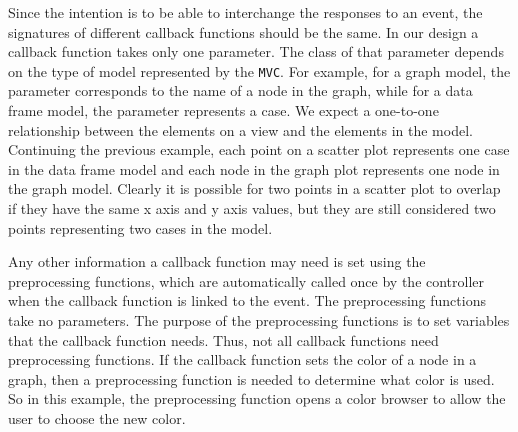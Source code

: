 \documentclass[11pt]{article}
\newcommand{\Robject}[1]{{\texttt{#1}}}
\begin{document}
Since the intention is to be able to interchange the responses to an event,
the signatures of different callback functions should be the same.
In our design a callback function takes only one parameter. 
The class of that parameter depends on the type of model represented by the
\Robject{MVC}.  For example, for a graph model, the parameter corresponds to
the name of a node in the graph, while for a data frame model, the parameter
represents a case.  We expect a one-to-one relationship between the elements
on a view and the elements in the model.  Continuing the previous example,
each point on a scatter plot represents one case in the data frame model and
each node in the graph plot represents one node in the graph model.  Clearly
it is possible for two points in a scatter plot to overlap if they have the
same x axis and y axis values, but they are still considered two points
representing two cases in the model.


Any other information a callback function may need is set using the
preprocessing functions, which are automatically called once by the controller
when the callback
function is linked to the event.  The preprocessing functions take no
parameters.  The purpose of the preprocessing functions is to set
variables that the callback function needs.  Thus, not all callback
functions need preprocessing functions.  If the callback
function sets the color of a node in a graph, then a preprocessing
function is needed to determine what color is used.  So in this
example, the preprocessing function opens a color browser to allow the
user to choose the new color.
\end{document}
